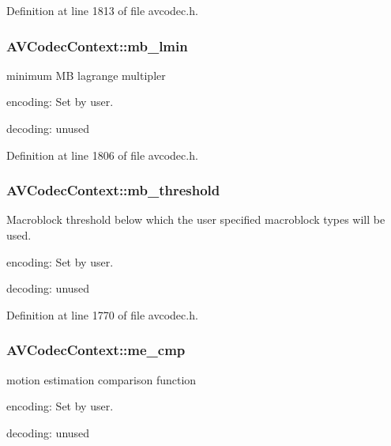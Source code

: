 Definition at line 1813 of file avcodec.\+h.

\subsubsection[{\texorpdfstring{mb\+\_\+lmin}{mb_lmin}}]{ A\+V\+Codec\+Context\+::mb\+\_\+lmin}\hypertarget{struct_a_v_codec_context_aa2a4d11439556b459cc0c833c8d9dc3d}{}\label{struct_a_v_codec_context_aa2a4d11439556b459cc0c833c8d9dc3d}
minimum MB lagrange multipler
\begin{DoxyItemize}
\item encoding\+: Set by user.
\item decoding\+: unused 
\end{DoxyItemize}

Definition at line 1806 of file avcodec.\+h.

\subsubsection[{\texorpdfstring{mb\+\_\+threshold}{mb_threshold}}]{ A\+V\+Codec\+Context\+::mb\+\_\+threshold}\hypertarget{struct_a_v_codec_context_a3bacd97ea1b5f7c449ebb06ed526f2c9}{}\label{struct_a_v_codec_context_a3bacd97ea1b5f7c449ebb06ed526f2c9}
Macroblock threshold below which the user specified macroblock types will be used.
\begin{DoxyItemize}
\item encoding\+: Set by user.
\item decoding\+: unused 
\end{DoxyItemize}

Definition at line 1770 of file avcodec.\+h.

\subsubsection[{\texorpdfstring{me\+\_\+cmp}{me_cmp}}]{ A\+V\+Codec\+Context\+::me\+\_\+cmp}\hypertarget{struct_a_v_codec_context_a184b7563344db253540f222d8d023ae1}{}\label{struct_a_v_codec_context_a184b7563344db253540f222d8d023ae1}
motion estimation comparison function
\begin{DoxyItemize}
\item encoding\+: Set by user.
\item decoding\+: unused 
\end{DoxyItemize}

